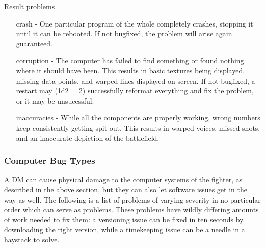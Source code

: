 \documentclass[a4paper]{article}
\begin{document}
\vspace{0.2cm}
Result problems
\begin{enumerate}[leftmargin=4cm]
\item [crash] - One particular program of the whole completely crashes, stopping it until it can be rebooted. If not bugfixed, the problem will arise again guaranteed.
\item [corruption] - The computer has failed to find something or found nothing where it should have been. This results in basic textures being displayed, missing data points, and warped lines displayed on screen. If not bugfixed, a restart may (1d2 = 2) successfully reformat everything and fix the problem, or it may be unsucessful.
\item [inaccuracies] - While all the components are properly working, wrong numbers keep consistently getting spit out. This results in warped voices, missed shots, and an inaccurate depiction of the battlefield.
\end{enumerate}

\subsubsection{Computer Bug Types} \label{fighter_computer_bug_types}

A DM can cause physical damage to the computer systems of the fighter, as described in the above section, but they can also let software issues get in the way as well. The following is a list of problems of varying severity in no particular order which can serve as problems. These problems have wildly differing amounts of work needed to fix them: a versioning issue can be fixed in ten seconds by downloading the right version, while a timekeeping issue can be a needle in a haystack to solve.
\end{document}
